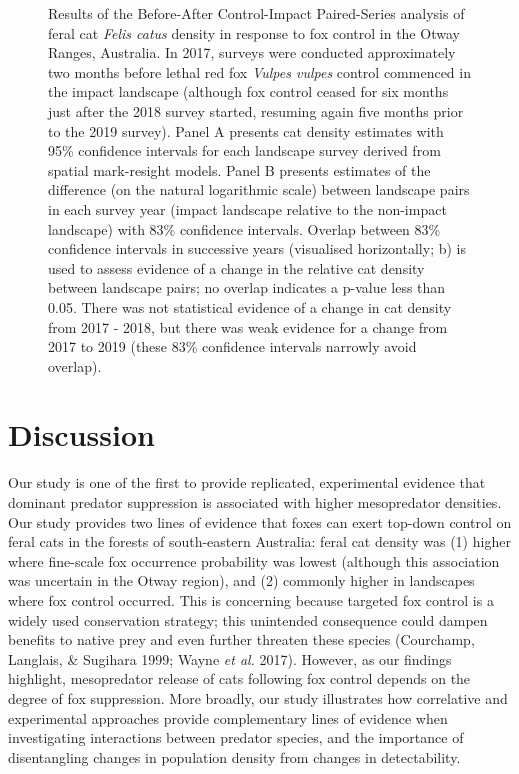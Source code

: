 \documentclass[11pt,a4paper,titlepage,twoside,openright]{style/unimelbthesis}
\begin{document}
\begin{mainmatter}
\begin{figure}
{}

\caption{Results of the Before-After Control-Impact Paired-Series analysis of feral cat \textit{Felis catus} density in response to fox control in the Otway Ranges, Australia. In 2017, surveys were conducted approximately two months before lethal red fox \textit{Vulpes vulpes} control commenced in the impact landscape (although fox control ceased for six months just after the 2018 survey started, resuming again five months prior to the 2019 survey). Panel A presents cat density estimates with 95\% confidence intervals for each landscape survey derived from spatial mark-resight models. Panel B presents estimates of the difference (on the natural logarithmic scale) between landscape pairs in each survey year (impact landscape relative to the non-impact landscape) with 83\% confidence intervals. Overlap between 83\% confidence intervals in successive years (visualised horizontally; b) is used to assess evidence of a change in the relative cat density between landscape pairs; no overlap indicates a p-value less than 0.05. There was not statistical evidence of a change in cat density from 2017 - 2018, but there was weak evidence for a change from 2017 to 2019 (these 83\% confidence intervals narrowly avoid overlap).}\label{fig:diffo}
\end{figure}
\newpage

\hypertarget{discussion-2}{%
\section{Discussion}\label{discussion-2}}

Our study is one of the first to provide replicated, experimental evidence that dominant predator suppression is associated with higher mesopredator densities. Our study provides two lines of evidence that foxes can exert top-down control on feral cats in the forests of south-eastern Australia: feral cat density was (1) higher where fine-scale fox occurrence probability was lowest (although this association was uncertain in the Otway region), and (2) commonly higher in landscapes where fox control occurred. This is concerning because targeted fox control is a widely used conservation strategy; this unintended consequence could dampen benefits to native prey and even further threaten these species (Courchamp, Langlais, \& Sugihara 1999; Wayne \emph{et al.} 2017). However, as our findings highlight, mesopredator release of cats following fox control depends on the degree of fox suppression. More broadly, our study illustrates how correlative and experimental approaches provide complementary lines of evidence when investigating interactions between predator species, and the importance of disentangling changes in population density from changes in detectability.


\end{mainmatter}
\end{document}
